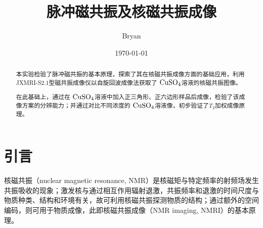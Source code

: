 \documentclass[aps,pre,12pt,preprint,%
	onecolumn,showpacs,showkeys,nofootinbib]{revtex4-1}
\newcommand{\cuSample}{$\mrm{CuSO_4}$溶液}
\begin{document}
	\title{%
	\texstringonly{\hfil\\[2\baselineskip]}
	\sf\LARGE%
		脉冲磁共振及核磁共振成像%
	\texstringonly{\vspace{3ex}}}
	\author{\fangsong\large%
		Bryan%
	\vspace{2mm}}
	\date{\today}

\begin{abstract}
\vspace{10mm}
\begin{spacing}{1.5}\normalsize
\setlength{\parskip}{.3\baselineskip}
	本实验检验了脉冲磁共振的基本原理，探索了其在核磁共振成像方面的基础应用，利用JXMRI-S2.1型磁共振成像仪以自旋回波成像法获取了 \cuSample 的核磁共振图像。
	
	在此基础上，通过在 \cuSample 中加入正三角形、正六边形样品后成像，检验了该成像方案的分辨能力；并通过对比不同浓度的 \cuSample 像，初步验证了$T_2$加权成像原理。
\end{spacing}
\end{abstract}

\maketitle
\thispagestyle{titlepagestyle}

\section{引言}
\vspace{-1ex}
	核磁共振（nuclear magnetic resonance, NMR）是核磁矩与特定频率的射频场发生共振吸收的现象；激发核与通过相互作用辐射退激，共振频率和退激的时间尺度与物质种类、结构和环境有关，故可利用核磁共振探测物质的结构；通过额外的空间编码，则可用于物质成像，此即核磁共振成像（NMR imaging, NMRI）的基本原理。
	
\end{document}

